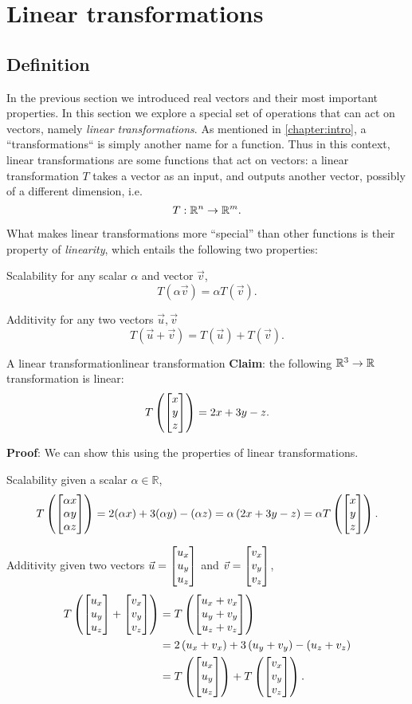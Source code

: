 \section{Linear transformations}
\subsection{Definition}
In the previous section we introduced real vectors and their most important properties. In this section we explore a special set of operations that can act on vectors, namely \emph{linear transformations}. As mentioned in \autoref{chapter:intro}, a ``transformations`` is simply another name for a function. Thus in this context, linear transformations are some functions that act on vectors: a linear transformation $T$ takes a vector as an input, and outputs another vector, possibly of a different dimension, i.e.
\begin{equation}
	T:\mathbb{R}^{n}\to\mathbb{R}^{m}.
	\label{eq:linear transformation signature}
\end{equation}

What makes linear transformations more ``special'' than other functions is their property of \emph{linearity}, which entails the following two properties:
\begin{listitemize}
	\item[Scalability] for any scalar $\alpha$ and vector $\vec{v}$,
		\[
			T\left( \alpha\vec{v} \right) = \alpha T\left( \vec{v} \right).
		\]
	\item[Additivity] for any two vectors $\vec{u},\vec{v}$
		\[
			T\left( \vec{u}+\vec{v} \right) = T\left( \vec{u} \right) + T\left( \vec{v} \right).
		\]
\end{listitemize}

\begin{example}{A linear transformation}{linear transformation}
	\textbf{Claim}: the following $\mathbb{R}^{3}\to\mathbb{R}$ transformation is linear:
	\[
		T\left(\colvec{x;y;z}\right) = 2x+3y-z.
	\]

	\textbf{Proof}: We can show this using the properties of linear transformations.
	\begin{listitemize}
	\item[Scalability] given a scalar $\alpha\in\mathbb{R}$,
		\[
			T\left(\colvec{\alpha x;\alpha y; \alpha z}\right)
			= 2(\alpha x)+3(\alpha y)-(\alpha z) = \alpha\left( 2x+3y-z \right)
			= \alpha T\left(\colvec{x;y;z}\right).
		\]
	\item[Additivity] given two vectors $\vec{u}=\colvec{u_{x};u_{y};u_{z}}$ and $\vec{v}=\colvec{v_{x};v_{y};v_{z}}$,
		\begin{align*}
			T\left( \colvec{u_{x};u_{y};u_{z}} + \colvec{v_{x};v_{y};v_{z}} \right) &= T\left( \colvec{u_{x}+v_{x};u_{y}+v_{y};u_{z}+v_{z}} \right)\\
			&= 2\left( u_{x}+v_{x} \right) +3\left( u_{y}+v_{y} \right) - \left( u_{z}+v_{z} \right)\\
			&= T\left( \colvec{u_{x};u_{y};u_{z}} \right) + T\left( \colvec{v_{x};v_{y};v_{z}} \right).
		\end{align*}
	\end{listitemize}
\end{example}

